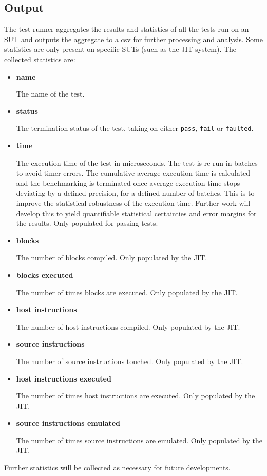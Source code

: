 \subsection{Output}

The test runner aggregates the results and statistics of all the tests run on an SUT and outputs the aggregate to a csv for further processing and analysis. Some statistics are only present on specific SUTs (such as the JIT system). The collected statistics are:

\begin{itemize}
    \item \textbf{name}
    
    The name of the test.

    \item \textbf{status}
    
    The termination status of the test, taking on either \texttt{pass}, \texttt{fail} or \texttt{faulted}.

    \item \textbf{time}
    
    The execution time of the test in microseconds. The test is re-run in batches to avoid timer errors. The cumulative average execution time is calculated and the benchmarking is terminated once average execution time stops deviating by a defined precision, for a defined number of batches. This is to improve the statistical robustness of the execution time. Further work will develop this to yield quantifiable statistical certainties and error margins for the results. Only populated for passing tests.

    \item \textbf{blocks}
    
    The number of blocks compiled. Only populated by the JIT.

    \item \textbf{blocks executed}
    
    The number of times blocks are executed. Only populated by the JIT.

    \item \textbf{host instructions}
    
    The number of host instructions compiled. Only populated by the JIT.

    \item \textbf{source instructions}
    
    The number of source instructions touched. Only populated by the JIT.

    \item \textbf{host instructions executed}
    
    The number of times host instructions are executed. Only populated by the JIT.

    \item \textbf{source instructions emulated}
    
    The number of times source instructions are emulated. Only populated by the JIT.
\end{itemize}

Further statistics will be collected as necessary for future developments.